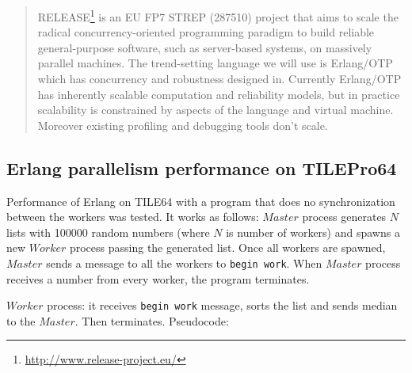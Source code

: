 \documentclass[english,11pt]{l4proj}
\begin{document}
\begin{quote}
RELEASE\footnote{\url{http://www.release-project.eu/}} is an EU FP7 STREP
(287510) project that aims to scale the radical concurrency-oriented programming
paradigm to build reliable general-purpose software, such as server-based
systems, on massively parallel machines. The trend-setting language we will use
is Erlang/OTP which has concurrency and robustness designed in. Currently
Erlang/OTP has inherently scalable computation and reliability models, but in
practice scalability is constrained by aspects of the language and virtual
machine. Moreover existing profiling and debugging tools don't scale.
\end{quote}

\subsection{Erlang parallelism performance on TILEPro64}

Performance of Erlang on TILE64 with a program that does no synchronization
between the workers was tested. It works as follows: $Master$ process generates
$N$ lists with 100000 random numbers (where $N$ is number of workers) and spawns
a new $Worker$ process passing the generated list. Once all workers are spawned,
$Master$ sends a message to all the workers to {\tt begin work}. When $Master$
process receives a number from every worker, the program terminates.

$Worker$ process: it receives {\tt begin work} message, sorts the list and
sends median to the $Master$. Then terminates. Pseudocode:
\end{document}
